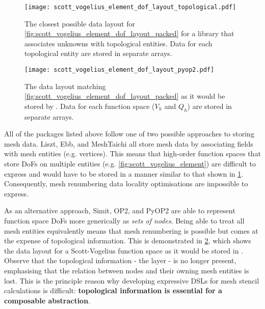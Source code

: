 \documentclass[thesis]{subfiles}
\begin{document}
\begin{figure}
  \centering
  \texttt{[image: scott\_vogelius\_element\_dof\_layout\_topological.pdf]}
  \caption{
    The closest possible data layout for \cref{fig:scott_vogelius_element_dof_layout_packed} for a library that associates unknowns with topological entities.
    Data for each topological entity are stored in separate arrays.
  }
  \label{fig:scott_vogelius_element_dof_layout_topological}
\end{figure}

\begin{figure}
  \centering
  \texttt{[image: scott\_vogelius\_element\_dof\_layout\_pyop2.pdf]}
  \caption{
    The data layout matching \cref{fig:scott_vogelius_element_dof_layout_packed} as it would be stored by .
    Data for each function space ($V_h$ and $Q_h$) are stored in separate arrays.
  }
  \label{fig:scott_vogelius_element_dof_layout_pyop2}
\end{figure}

All of the packages listed above follow one of two possible approaches to storing mesh data.
Liszt, Ebb, and MeshTaichi all store mesh data by associating fields with mesh entities (e.g. vertices).
This means that high-order function spaces that store DoFs on multiple entities (e.g. \cref{fig:scott_vogelius_element}) are difficult to express and would have to be stored in a manner similar to that shown in \cref{fig:scott_vogelius_element_dof_layout_topological}.
Consequently, mesh renumbering data locality optimisations are impossible to express.

As an alternative approach, Simit, OP2, and PyOP2 are able to represent function space DoFs more generically as \textit{sets of nodes}.
Being able to treat all mesh entities equivalently means that mesh renumbering is possible but comes at the expense of topological information.
This is demonstrated in \cref{fig:scott_vogelius_element_dof_layout_pyop2}, which shows the data layout for a Scott-Vogelius function space as it would be stored in .
Observe that the topological information - the  layer - is no longer present, emphasising that the relation between nodes and their owning mesh entities is lost.
This is the principle reason why developing expressive DSLs for mesh stencil calculations is difficult: \textbf{topological information is essential for a composable abstraction}.

\end{document}
